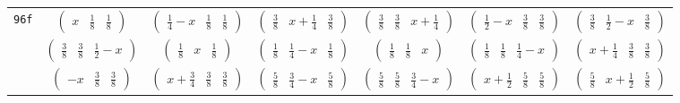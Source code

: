 \documentclass[fleqn,9pt,landscape]{jsarticle}
\begin{document}
\begin{center}
\begin{longtable}{ccccccc}
{\tt 96f} & $ \begin{pmatrix} x & \frac{1}{8} & \frac{1}{8} \end{pmatrix} $ & $ \begin{pmatrix} \frac{1}{4} - x & \frac{1}{8} & \frac{1}{8} \end{pmatrix} $ & $ \begin{pmatrix} \frac{3}{8} & x + \frac{1}{4} & \frac{3}{8} \end{pmatrix} $ & $ \begin{pmatrix} \frac{3}{8} & \frac{3}{8} & x + \frac{1}{4} \end{pmatrix} $ & $ \begin{pmatrix} \frac{1}{2} - x & \frac{3}{8} & \frac{3}{8} \end{pmatrix} $ & $ \begin{pmatrix} \frac{3}{8} & \frac{1}{2} - x & \frac{3}{8} \end{pmatrix} $ \\
& $ \begin{pmatrix} \frac{3}{8} & \frac{3}{8} & \frac{1}{2} - x \end{pmatrix} $ & $ \begin{pmatrix} \frac{1}{8} & x & \frac{1}{8} \end{pmatrix} $ & $ \begin{pmatrix} \frac{1}{8} & \frac{1}{4} - x & \frac{1}{8} \end{pmatrix} $ & $ \begin{pmatrix} \frac{1}{8} & \frac{1}{8} & x \end{pmatrix} $ & $ \begin{pmatrix} \frac{1}{8} & \frac{1}{8} & \frac{1}{4} - x \end{pmatrix} $ & $ \begin{pmatrix} x + \frac{1}{4} & \frac{3}{8} & \frac{3}{8} \end{pmatrix} $ \\
& $ \begin{pmatrix} - x & \frac{3}{8} & \frac{3}{8} \end{pmatrix} $ & $ \begin{pmatrix} x + \frac{3}{4} & \frac{3}{8} & \frac{3}{8} \end{pmatrix} $ & $ \begin{pmatrix} \frac{5}{8} & \frac{3}{4} - x & \frac{5}{8} \end{pmatrix} $ & $ \begin{pmatrix} \frac{5}{8} & \frac{5}{8} & \frac{3}{4} - x \end{pmatrix} $ & $ \begin{pmatrix} x + \frac{1}{2} & \frac{5}{8} & \frac{5}{8} \end{pmatrix} $ & $ \begin{pmatrix} \frac{5}{8} & x + \frac{1}{2} & \frac{5}{8} \end{pmatrix} $ \\

\end{longtable}
\end{center}
\end{document}
